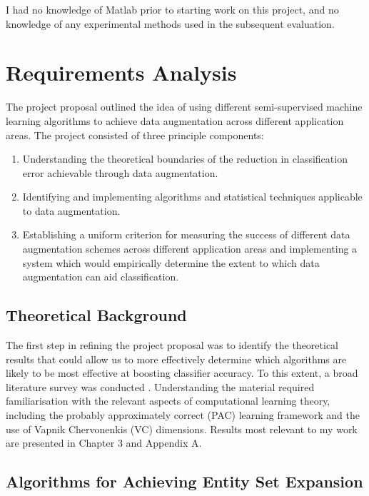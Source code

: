 \documentclass[12pt,twoside,notitlepage,amsart]{report} %
\begin{document}
	I had no knowledge of Matlab prior to starting work on this project, and no knowledge of any experimental methods used in the subsequent evaluation. 
	
	\section{Requirements Analysis}
	
	The project proposal outlined the idea of using different semi-supervised machine learning algorithms to achieve data augmentation across different application areas. The project consisted of three principle components: 
	
	\begin{enumerate}
		\item Understanding the theoretical boundaries of the reduction in classification error achievable through data augmentation.
		\item Identifying and implementing algorithms and statistical techniques applicable to data augmentation. 
		\item Establishing a uniform criterion for measuring the success of different data augmentation schemes across different application areas and implementing a system which would empirically determine the extent to which data augmentation can aid classification.
	\end{enumerate}
	
	\subsection{Theoretical Background}
	
	The first step in refining the project proposal was to identify the theoretical results that could allow us to more effectively determine which algorithms are likely to be most effective at boosting classifier accuracy. To this extent, a broad literature survey was conducted \cite{Castelli95, Chapelle06, Letham13, Liu02, Nigam98}. Understanding the material required familiarisation with the relevant aspects of computational learning theory, including the probably approximately correct ({PAC}) learning framework and the use of Vapnik Chervonenkis ({VC}) dimensions. Results most relevant to my work are presented in Chapter 3 and Appendix A. 
	
	\subsection{Algorithms for Achieving Entity Set Expansion}
	
\end{document}
